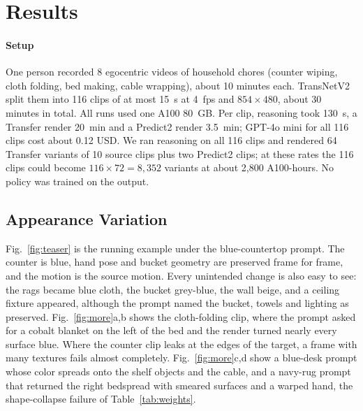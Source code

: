 \section{Results}
\label{sec:results}

\paragraph{Setup}
One person recorded 8 egocentric videos of household chores (counter wiping, cloth folding, bed making, cable wrapping), about 10 minutes each. TransNetV2~\cite{transnetv2} split them into 116 clips of at most 15~s at 4~fps and $854\times480$, about 30 minutes in total. All runs used one A100 80~GB. Per clip, reasoning took 130~s, a Transfer render 20~min and a Predict2 render 3.5~min; GPT-4o mini for all 116 clips cost about 0.12 USD. We ran reasoning on all 116 clips and rendered 64 Transfer variants of 10 source clips plus two Predict2 clips; at these rates the 116 clips could become $116\times72 = 8{,}352$ variants at about 2{,}800 A100-hours. No policy was trained on the output.

\subsection{Appearance Variation}
Fig.~\ref{fig:teaser} is the running example under the blue-countertop prompt. The counter is blue, hand pose and bucket geometry are preserved frame for frame, and the motion is the source motion. Every unintended change is also easy to see: the rags became blue cloth, the bucket grey-blue, the wall beige, and a ceiling fixture appeared, although the prompt named the bucket, towels and lighting as preserved. Fig.~\ref{fig:more}a,b shows the cloth-folding clip, where the prompt asked for a cobalt blanket on the left of the bed and the render turned nearly every surface blue. Where the counter clip leaks at the edges of the target, a frame with many textures fails almost completely. Fig.~\ref{fig:more}c,d show a blue-desk prompt whose color spreads onto the shelf objects and the cable, and a navy-rug prompt that returned the right bedspread with smeared surfaces and a warped hand, the shape-collapse failure of Table~\ref{tab:weights}.

